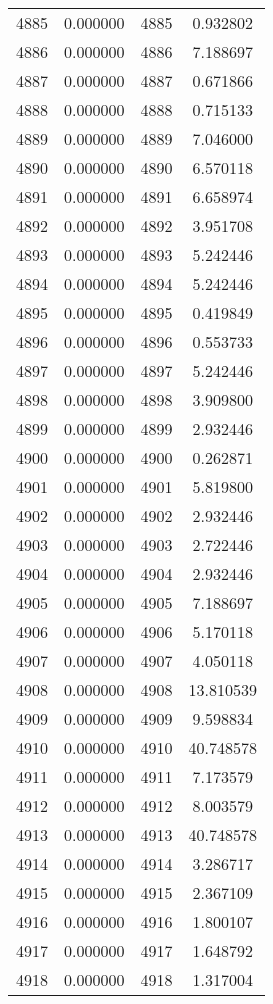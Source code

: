 \documentclass[12pt]{article}
\begin{document}
\begin{longtable}{@{}cccc@{}}
4885 & 0.000000 & 4885 & 0.932802 \\
4886 & 0.000000 & 4886 & 7.188697 \\
4887 & 0.000000 & 4887 & 0.671866 \\
4888 & 0.000000 & 4888 & 0.715133 \\
4889 & 0.000000 & 4889 & 7.046000 \\
4890 & 0.000000 & 4890 & 6.570118 \\
4891 & 0.000000 & 4891 & 6.658974 \\
4892 & 0.000000 & 4892 & 3.951708 \\
4893 & 0.000000 & 4893 & 5.242446 \\
4894 & 0.000000 & 4894 & 5.242446 \\
4895 & 0.000000 & 4895 & 0.419849 \\
4896 & 0.000000 & 4896 & 0.553733 \\
4897 & 0.000000 & 4897 & 5.242446 \\
4898 & 0.000000 & 4898 & 3.909800 \\
4899 & 0.000000 & 4899 & 2.932446 \\
4900 & 0.000000 & 4900 & 0.262871 \\
4901 & 0.000000 & 4901 & 5.819800 \\
4902 & 0.000000 & 4902 & 2.932446 \\
4903 & 0.000000 & 4903 & 2.722446 \\
4904 & 0.000000 & 4904 & 2.932446 \\
4905 & 0.000000 & 4905 & 7.188697 \\
4906 & 0.000000 & 4906 & 5.170118 \\
4907 & 0.000000 & 4907 & 4.050118 \\
4908 & 0.000000 & 4908 & 13.810539 \\
4909 & 0.000000 & 4909 & 9.598834 \\
4910 & 0.000000 & 4910 & 40.748578 \\
4911 & 0.000000 & 4911 & 7.173579 \\
4912 & 0.000000 & 4912 & 8.003579 \\
4913 & 0.000000 & 4913 & 40.748578 \\
4914 & 0.000000 & 4914 & 3.286717 \\
4915 & 0.000000 & 4915 & 2.367109 \\
4916 & 0.000000 & 4916 & 1.800107 \\
4917 & 0.000000 & 4917 & 1.648792 \\
4918 & 0.000000 & 4918 & 1.317004 \\

\end{longtable}
\end{document}
